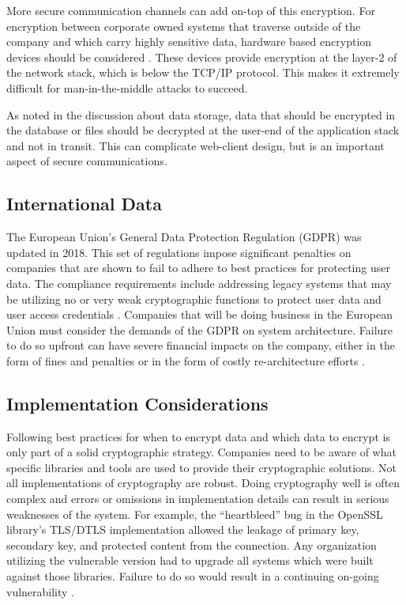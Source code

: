 More secure communication channels can add on-top of this encryption. For encryption between corporate owned systems that traverse outside of the company and which carry highly sensitive data, hardware based encryption devices should be considered \parencite{zybersafeZybersafeTrafficcloakNetwork}. These devices provide encryption at the layer-2 of the network stack, which is below the TCP/IP protocol. This makes it extremely difficult for man-in-the-middle attacks to succeed.

As noted in the discussion about data storage, data that should be encrypted in the database or files should be decrypted at the user-end of the application stack and not in transit. This can complicate web-client design, but is an important aspect of secure communications.

\subsection{International Data}

The European Union's General Data Protection Regulation (GDPR) was updated in 2018. This set of regulations impose significant penalties on companies that are shown to fail to adhere to best practices for protecting user data. The compliance requirements include addressing legacy systems that may be utilizing no or very weak cryptographic functions to protect user data and user access credentials \parencite{blueNovelApproachProtecting2018}. Companies that will be doing business in the European Union must consider the demands of the GDPR on system architecture. Failure to do so upfront can have severe financial impacts on the company, either in the form of fines and penalties or in the form of costly re-architecture efforts \parencite{yuanPolicyEffectGeneral2019}.

\subsection{Implementation Considerations}

Following best practices for when to encrypt data and which data to encrypt is only part of a solid cryptographic strategy. Companies need to be aware of what specific libraries and tools are used to provide their cryptographic solutions. Not all implementations of cryptography are robust. Doing cryptography well is often complex and errors or omissions in implementation details can result in serious weaknesses of the system. For example, the ``heartbleed'' bug in the OpenSSL library's TLS/DTLS implementation allowed the leakage of primary key, secondary key, and protected content from the connection. Any organization utilizing the vulnerable version had to upgrade all systems which were built against those libraries. Failure to do so would result in a continuing on-going vulnerability \parencite{naHeartbleedBug}.

